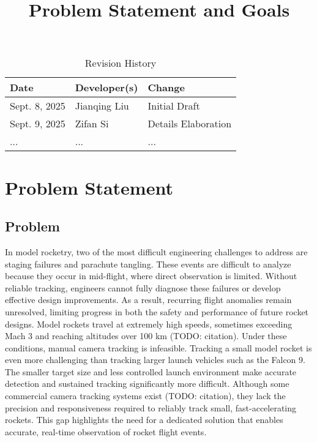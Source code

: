 \documentclass{article}
\title{Problem Statement and Goals\\\progname}
\author{\authname}
\date{}
\begin{document}
\maketitle

\begin{table}[hp]
\caption{Revision History} \label{TblRevisionHistory}
\begin{tabularx}{\textwidth}{llX}
\toprule
\textbf{Date} & \textbf{Developer(s)} & \textbf{Change}\\
\midrule
Sept. 8, 2025 & Jianqing Liu & Initial Draft\\
Sept. 9, 2025 & Zifan Si & Details Elaboration\\
... & ... & ...\\
\bottomrule
\end{tabularx}
\end{table}

\section{Problem Statement}



\subsection{Problem}

In model rocketry, two of the most difficult engineering challenges to address are staging failures and parachute tangling. These events are difficult to analyze because they occur in mid-flight, where direct observation is limited. Without reliable tracking, engineers cannot fully diagnose these failures or develop effective design improvements. As a result, recurring flight anomalies remain unresolved, limiting progress in both the safety and performance of future rocket designs.  
Model rockets travel at extremely high speeds, sometimes exceeding Mach 3 and reaching altitudes over 100 km (TODO: citation). Under these conditions, manual camera tracking is infeasible.  
Tracking a small model rocket is even more challenging than tracking larger launch vehicles such as the Falcon 9. The smaller target size and less controlled launch environment make accurate detection and sustained tracking significantly more difficult.  
Although some commercial camera tracking systems exist (TODO: citation), they lack the precision and responsiveness required to reliably track small, fast-accelerating rockets. This gap highlights the need for a dedicated solution that enables accurate, real-time observation of rocket flight events.  
\end{document}
